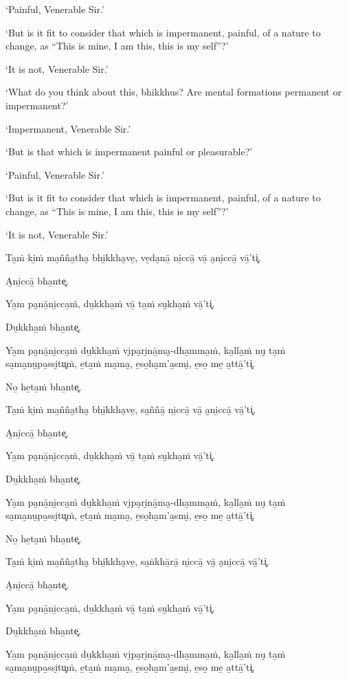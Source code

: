 ‘Painful, Venerable Sir.’

‘But is it fit to consider that which is impermanent, painful, of a
nature to change, as “This is mine, I am this, this is my self”?’

‘It is not, Venerable Sir.’

‘What do you think about this, bhikkhus? Are mental formations
permanent or impermanent?’

‘Impermanent, Venerable Sir.’

‘But is that which is impermanent painful or pleasurable?’

‘Painful, Venerable Sir.’

‘But is it fit to consider that which is impermanent, painful, of a
nature to change, as “This is mine, I am this, this is my self”?’

‘It is not, Venerable Sir.’

\clearpage

\paliText
\markboth{\paliTitle}{\rightmark}

Ta̱ṁ ki̱ṁ ma̱ñña̮tha̮ bhi̱kkha̮ve̱, ve̱da̮nā̱ ni̱ccā̱ vā̱ a̮ni̱ccā̱ vā̱'ti͓.

A̮ni̱ccā̱ bha̱nte͓.

Ya̱m pa̮nā̱ni̱cca̱ṁ, du̱kkha̱ṁ vā̱ ta̱ṁ su̮kha̱ṁ vā̱'ti͓.

Du̱kkha̱ṁ bha̱nte͓.

Ya̱m pa̮nā̱ni̱cca̱ṁ du̱kkha̱ṁ vi̮pa̮ri̮nā̱ma̮-dha̱mma̱ṁ, ka̱lla̱ṁ nu̮ ta̱ṁ sa̮ma̮nu̮pa̱ssi̮tu͓ṁ,
e̱ta̱ṁ ma̮ma̮, e̱so̱ha̮m'a̱smi̮, e̱so̱ me̱ a̱ttā̱'ti͓.

No̱ he̱ta̱ṁ bha̱nte͓.

Ta̱ṁ ki̱ṁ ma̱ñña̮tha̮ bhi̱kkha̮ve̱, sa̱ññā̱ ni̱ccā̱ vā̱ a̮ni̱ccā̱ vā̱'ti͓.

A̮ni̱ccā̱ bha̱nte͓.

Ya̱m pa̮nā̱ni̱cca̱ṁ, du̱kkha̱ṁ vā̱ ta̱ṁ su̮kha̱ṁ vā̱'ti͓.

Du̱kkha̱ṁ bha̱nte͓.

Ya̱m pa̮nā̱ni̱cca̱ṁ du̱kkha̱ṁ vi̮pa̮ri̮nā̱ma̮-dha̱mma̱ṁ, ka̱lla̱ṁ nu̮ ta̱ṁ sa̮ma̮nu̮pa̱ssi̮tu͓ṁ,
e̱ta̱ṁ ma̮ma̮, e̱so̱ha̮m'a̱smi̮, e̱so̱ me̱ a̱ttā̱'ti͓.

No̱ he̱ta̱ṁ bha̱nte͓.

Ta̱ṁ ki̱ṁ ma̱ñña̮tha̮ bhi̱kkha̮ve̱, sa̱ṅkhā̱rā̱ ni̱ccā̱ vā̱ a̮ni̱ccā̱ vā̱'ti͓.

A̮ni̱ccā̱ bha̱nte͓.

Ya̱m pa̮nā̱ni̱cca̱ṁ, du̱kkha̱ṁ vā̱ ta̱ṁ su̮kha̱ṁ vā̱'ti͓.

Du̱kkha̱ṁ bha̱nte͓.

Ya̱m pa̮nā̱ni̱cca̱ṁ du̱kkha̱ṁ vi̮pa̮ri̮nā̱ma̮-dha̱mma̱ṁ, ka̱lla̱ṁ nu̮ ta̱ṁ sa̮ma̮nu̮pa̱ssi̮tu͓ṁ,
e̱ta̱ṁ ma̮ma̮, e̱so̱ha̮m'a̱smi̮, e̱so̱ me̱ a̱ttā̱'ti͓.

